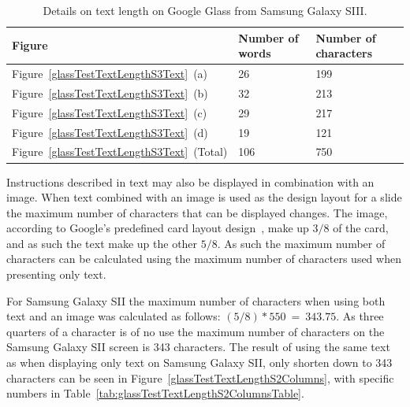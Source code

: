 	\begin{table}[ht!]
    		\caption{Details on text length on Google Glass from Samsung Galaxy SIII.} \label{tab:glassTestTextLengthS3TextTable}
		\centering \begin{tabularx}{\textwidth}{l|X|X} \hline
		\textbf{Figure} & \textbf{Number of words} & \textbf{Number of characters} \\ \hline \hline
       
		Figure~\ref{glassTestTextLengthS3Text}~(a)	&26	&199	\\ \hline
		Figure~\ref{glassTestTextLengthS3Text}~(b)	&32	&213	\\ \hline
		Figure~\ref{glassTestTextLengthS3Text}~(c)	&29	&217	\\ \hline
		Figure~\ref{glassTestTextLengthS3Text}~(d)	&19	&121	\\ \hline
		Figure~\ref{glassTestTextLengthS3Text}~(Total)	&106	&750	\\ \hline
		
		\end{tabularx}
	\end{table}

Instructions described in text may also be displayed in combination with an image. When text combined with an image is used as the design layout for a slide the maximum number of characters that can be displayed changes. The image, according to Google's predefined card layout design~\cite{glassDesignStyle}, make up \(3/8\) of the card, and as such the text make up the other \(5/8\). As such the maximum number of characters can be calculated using the maximum number of characters used when presenting only text.

For Samsung Galaxy SII the maximum number of characters when using both text and an image was calculated as follows: \((5/8)*550~=~343.75\). As three quarters of a character is of no use the maximum number of characters on the Samsung Galaxy SII screen is 343 characters. The result of using the same text as when displaying only text on Samsung Galaxy SII, only shorten down to 343 characters can be seen in Figure~\ref{glassTestTextLengthS2Columns}, with specific numbers in Table~\ref{tab:glassTestTextLengthS2ColumnsTable}.

